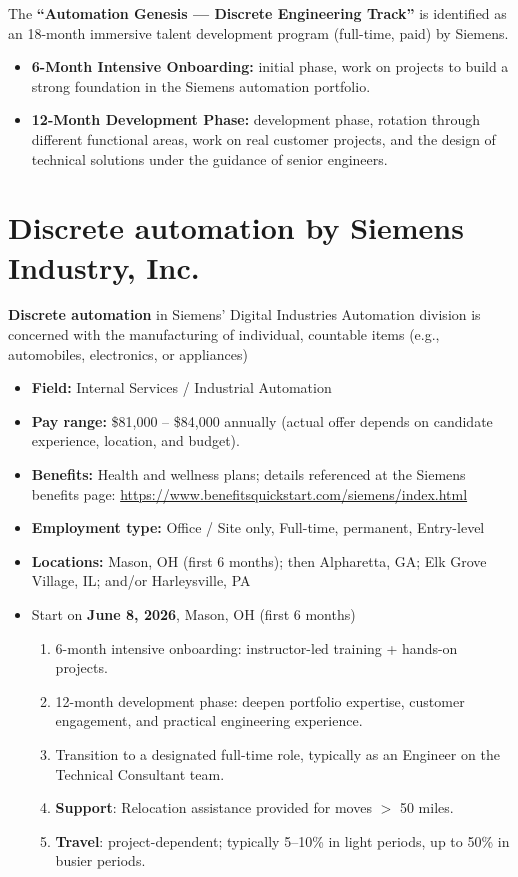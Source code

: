 \documentclass[11pt]{article}
\begin{document}
The \textbf{``Automation Genesis — Discrete Engineering Track''} is identified as 
an 18-month immersive talent development program (full-time, paid) by Siemens.
\begin{itemize}
  \item \textbf{6-Month Intensive Onboarding:} initial phase, work on projects to build a strong foundation in the Siemens automation portfolio.
  \item \textbf{12-Month Development Phase:} development phase, rotation through different functional areas, work on real customer projects, and the design of technical solutions under the guidance of senior engineers.
\end{itemize}

\section*{Discrete automation by \textbf{Siemens Industry, Inc.}}
\textbf{Discrete automation} in Siemens' Digital Industries Automation division is concerned with the manufacturing of individual, countable
items (e.g., automobiles, electronics, or appliances)

\begin{itemize}
  \item \textbf{Field:} Internal Services / Industrial Automation
  \item \textbf{Pay range:} \$81,000 -- \$84,000 annually (actual offer depends on candidate experience, location, and budget).
  \item \textbf{Benefits:} Health and wellness plans; details referenced at the Siemens benefits page: \url{https://www.benefitsquickstart.com/siemens/index.html}
  \item \textbf{Employment type:} Office / Site only, Full-time, permanent, Entry-level
  \item \textbf{Locations:} Mason, OH (first 6 months); then Alpharetta, GA; Elk Grove Village, IL; and/or Harleysville, PA
  \item Start on \textbf{June 8, 2026}, Mason, OH (first 6 months) 
  \begin{enumerate}[label=\arabic*., leftmargin=*]
    \item 6-month intensive onboarding: instructor-led training + hands-on projects.
    \item 12-month development phase: deepen portfolio expertise, customer engagement, and practical engineering experience.
    \item Transition to a designated full-time role, typically as an Engineer on the Technical Consultant team.
    \item \textbf{Support}: Relocation assistance provided for moves $>$ 50 miles.
    \item \textbf{Travel}: project-dependent; typically 5--10\% in light periods, up to 50\% in busier periods.
  \end{enumerate}
\end{itemize}
\end{document}
